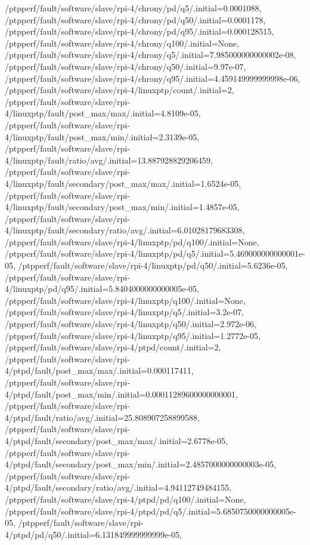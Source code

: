 {    /ptpperf/fault/software/slave/rpi-4/chrony/pd/q5/.initial=0.0001088,
    /ptpperf/fault/software/slave/rpi-4/chrony/pd/q50/.initial=0.0001178,
    /ptpperf/fault/software/slave/rpi-4/chrony/pd/q95/.initial=0.000128515,
    /ptpperf/fault/software/slave/rpi-4/chrony/q100/.initial=None,
    /ptpperf/fault/software/slave/rpi-4/chrony/q5/.initial=7.985000000000002e-08,
    /ptpperf/fault/software/slave/rpi-4/chrony/q50/.initial=9.97e-07,
    /ptpperf/fault/software/slave/rpi-4/chrony/q95/.initial=4.459149999999998e-06,
    /ptpperf/fault/software/slave/rpi-4/linuxptp/count/.initial=2,
    /ptpperf/fault/software/slave/rpi-4/linuxptp/fault/post_max/max/.initial=4.8109e-05,
    /ptpperf/fault/software/slave/rpi-4/linuxptp/fault/post_max/min/.initial=2.3139e-05,
    /ptpperf/fault/software/slave/rpi-4/linuxptp/fault/ratio/avg/.initial=13.887928829206459,
    /ptpperf/fault/software/slave/rpi-4/linuxptp/fault/secondary/post_max/max/.initial=1.6524e-05,
    /ptpperf/fault/software/slave/rpi-4/linuxptp/fault/secondary/post_max/min/.initial=1.4857e-05,
    /ptpperf/fault/software/slave/rpi-4/linuxptp/fault/secondary/ratio/avg/.initial=6.01028179683308,
    /ptpperf/fault/software/slave/rpi-4/linuxptp/pd/q100/.initial=None,
    /ptpperf/fault/software/slave/rpi-4/linuxptp/pd/q5/.initial=5.469000000000001e-05,
    /ptpperf/fault/software/slave/rpi-4/linuxptp/pd/q50/.initial=5.6236e-05,
    /ptpperf/fault/software/slave/rpi-4/linuxptp/pd/q95/.initial=5.8404000000000005e-05,
    /ptpperf/fault/software/slave/rpi-4/linuxptp/q100/.initial=None,
    /ptpperf/fault/software/slave/rpi-4/linuxptp/q5/.initial=3.2e-07,
    /ptpperf/fault/software/slave/rpi-4/linuxptp/q50/.initial=2.972e-06,
    /ptpperf/fault/software/slave/rpi-4/linuxptp/q95/.initial=1.2772e-05,
    /ptpperf/fault/software/slave/rpi-4/ptpd/count/.initial=2,
    /ptpperf/fault/software/slave/rpi-4/ptpd/fault/post_max/max/.initial=0.000117411,
    /ptpperf/fault/software/slave/rpi-4/ptpd/fault/post_max/min/.initial=0.00011289600000000001,
    /ptpperf/fault/software/slave/rpi-4/ptpd/fault/ratio/avg/.initial=25.808907258899588,
    /ptpperf/fault/software/slave/rpi-4/ptpd/fault/secondary/post_max/max/.initial=2.6778e-05,
    /ptpperf/fault/software/slave/rpi-4/ptpd/fault/secondary/post_max/min/.initial=2.4857000000000003e-05,
    /ptpperf/fault/software/slave/rpi-4/ptpd/fault/secondary/ratio/avg/.initial=4.94112749484155,
    /ptpperf/fault/software/slave/rpi-4/ptpd/pd/q100/.initial=None,
    /ptpperf/fault/software/slave/rpi-4/ptpd/pd/q5/.initial=5.6850750000000005e-05,
    /ptpperf/fault/software/slave/rpi-4/ptpd/pd/q50/.initial=6.131849999999999e-05,
}
